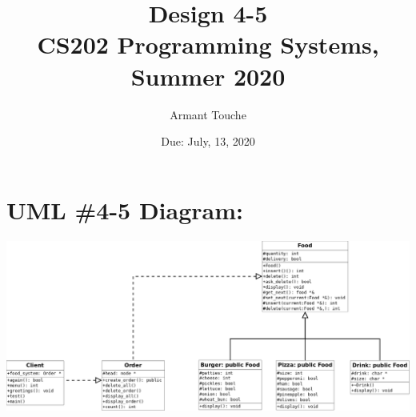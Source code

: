 \documentclass[11pt, a4paper]{article}
\title{\bf Design 4-5\\[1ex]
\rm\normalsize CS202 Programming Systems, Summer 2020 }
\date{\normalsize Due: July, 13, 2020}
\author{\normalsize Armant Touche}
\begin{document}
\vspace{0cm}\maketitle 

\section*{UML \#4-5 Diagram:}

            \begin{center}
            \includegraphics[width=.8\textwidth]{uml4}
            \end{center}
\end{document}

